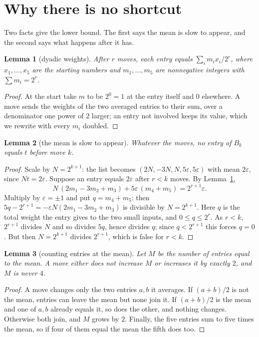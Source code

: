 \documentclass[11pt]{article}
\newtheorem{lemma}{Lemma}
\theoremstyle{remark}
\begin{document}
\section{Why there is no shortcut}

Two facts give the lower bound. The first says the mean is slow to appear, and the second says what happens
after it has.

\begin{lemma}[dyadic weights]\label{lem:weights}
After $r$ moves, each entry equals $\sum_i m_ix_i/2^r$, where $x_1,\dots,x_5$ are the starting numbers and
$m_1,\dots,m_5$ are nonnegative integers with $\sum m_i=2^r$.
\end{lemma}

\begin{proof}
At the start take $m$ to be $2^0=1$ at the entry itself and $0$ elsewhere. A move sends the weights of the
two averaged entries to their sum, over a denominator one power of $2$ larger; an entry not involved keeps its
value, which we rewrite with every $m_i$ doubled.
\end{proof}

\begin{lemma}[the mean is slow to appear]\label{lem:first}
Whatever the moves, no entry of $B_k$ equals $t$ before move $k$.
\end{lemma}

\begin{proof}
Scale by $N=2^{k+1}$: the list becomes $(2N,-3N,N,5\varepsilon,5\varepsilon)$ with mean $2\varepsilon$, since
$Nt=2\varepsilon$. Suppose an entry equals $2\varepsilon$ after $r<k$ moves. By Lemma~\ref{lem:weights},
\[
N\,(2m_1-3m_2+m_3)+5\varepsilon\,(m_4+m_5)=2^{r+1}\varepsilon .
\]
Multiply by $\varepsilon=\pm1$ and put $q=m_4+m_5$: then $5q-2^{r+1}=-\varepsilon N(2m_1-3m_2+m_3)$ is
divisible by $N=2^{k+1}$. Here $q$ is the total weight the entry gives to the two small inputs, and
$0\le q\le 2^r$. As $r<k$, $2^{r+1}$ divides $N$ and so divides $5q$, hence divides $q$; since $q<2^{r+1}$
this forces $q=0$. But then $N=2^{k+1}$ divides $2^{r+1}$, which is false for $r<k$.
\end{proof}

\begin{lemma}[counting entries at the mean]\label{lem:count}
Let $M$ be the number of entries equal to the mean. A move either does not increase $M$ or increases it by
exactly $2$, and $M$ is never $4$.
\end{lemma}

\begin{proof}
A move changes only the two entries $a,b$ it averages. If $(a+b)/2$ is not the mean, entries can leave the
mean but none join it. If $(a+b)/2$ is the mean and one of $a,b$ already equals it, so does the other, and
nothing changes. Otherwise both join, and $M$ grows by $2$. Finally, the five entries sum to five times the
mean, so if four of them equal the mean the fifth does too.
\end{proof}
\end{document}
